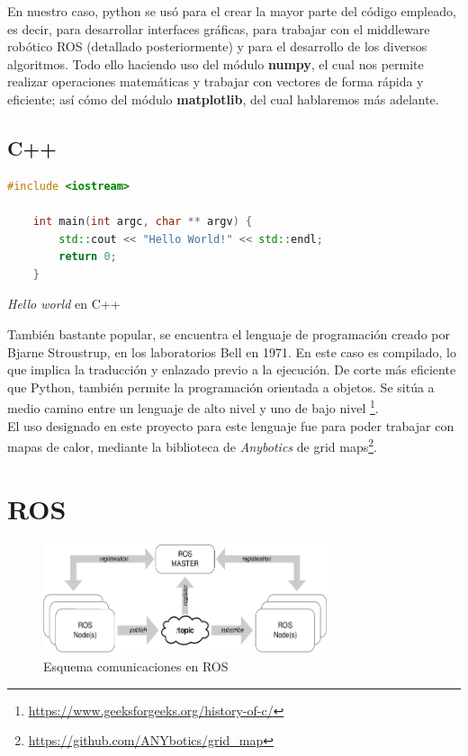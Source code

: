 En nuestro caso, python se usó para el crear la mayor parte del código empleado, es decir, para desarrollar interfaces gráficas, para trabajar con el middleware robótico \ac{ROS} (detallado posteriormente) y para el desarrollo de los diversos algoritmos. Todo ello haciendo uso del módulo \textbf{numpy}, el cual nos permite realizar operaciones matemáticas y trabajar con vectores de forma rápida y eficiente; así cómo del módulo \textbf{matplotlib}, del cual hablaremos más adelante.\\

\subsection{C++}
\label{subsec:cplusplus}

\begin{code}[tp]
	\begin{lstlisting}[language=C++]
	#include <iostream>
	
	int main(int argc, char ** argv) {
		std::cout << "Hello World!" << std::endl;
		return 0;
	}
	\end{lstlisting}
	\caption[Hello world en C++]{\emph{Hello world} en C++}
	\label{cod:helloworld_cplusplus}
\end{code}

También bastante popular, se encuentra el lenguaje de programación creado por Bjarne Stroustrup, en los laboratorios Bell en 1971. En este caso es compilado, lo que implica la traducción y enlazado previo a la ejecución. De corte más eficiente que Python, también permite la programación orientada a objetos. Se sitúa a medio camino entre un lenguaje de alto nivel y uno de bajo nivel \footnote[4]{\url{https://www.geeksforgeeks.org/history-of-c/}}.\\

El uso designado en este proyecto para este lenguaje fue para poder trabajar con mapas de calor, mediante la biblioteca de \emph{Anybotics} de grid maps\footnote[5]{\url{https://github.com/ANYbotics/grid_map}}.

\section{\ac{ROS}}
\label{sec:ros}

\begin{figure} [tp]
	\begin{center}
	\includegraphics[height=3.25cm]{imagenes/cap3/1_ros_esquema.png}
	\end{center}
	\caption[Esquema de comunicaciones en ROS]{Esquema comunicaciones en ROS}
	\label{fig:ros}
\end{figure}

